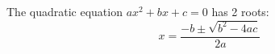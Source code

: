 \documentclass{article}
\begin{document}
The quadratic equation $ax^2+bx+c=0$ has 2 roots:  \[ x=\frac{-b \pm \sqrt{b^2-4ac}}{2a} \]
\end{document}
